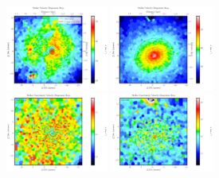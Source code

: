 \begin{figure}
      \\
      \includegraphics[width=0.3\textwidth]{chapter4/Mmaps/ngc1316_stellar_sigma.png}
      \includegraphics[width=0.3\textwidth]{chapter4/Mmaps/ngc1399_stellar_sigma.png}
      \\
      \includegraphics[width=0.3\textwidth]{chapter4/Mmaps/ngc1316_stellar_sigma_uncert.png}
      \includegraphics[width=0.3\textwidth]{chapter4/Mmaps/ngc1399_stellar_sigma_uncert.png}
      \\
\end{figure}
